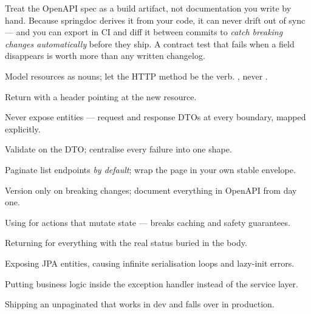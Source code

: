 \begin{seniornote}
Treat the OpenAPI spec as a build artifact, not documentation you write by hand. Because springdoc derives it from your code, it can never drift out of sync --- and you can export  in CI and diff it between commits to \emph{catch breaking changes automatically} before they ship. A contract test that fails when a field disappears is worth more than any written changelog.
\end{seniornote}

\begin{bestpractices}
\begin{wbitem}
  \item Model resources as nouns; let the HTTP method be the verb. , never .
  \item Return  with a  header pointing at the new resource.
  \item Never expose entities --- request and response DTOs at every boundary, mapped explicitly.
  \item Validate on the DTO; centralise every failure into one  shape.
  \item Paginate list endpoints \emph{by default}; wrap the page in your own stable envelope.
  \item Version only on breaking changes; document everything in OpenAPI from day one.
\end{wbitem}
\end{bestpractices}
\begin{mistakes}
\begin{wbitem}
  \item Using  for actions that mutate state --- breaks caching and safety guarantees.
  \item Returning  for everything with the real status buried in the body.
  \item Exposing JPA entities, causing infinite serialisation loops and lazy-init errors.
  \item Putting business logic inside the exception handler instead of the service layer.
  \item Shipping an unpaginated  that works in dev and falls over in production.
\end{wbitem}
\end{mistakes}


